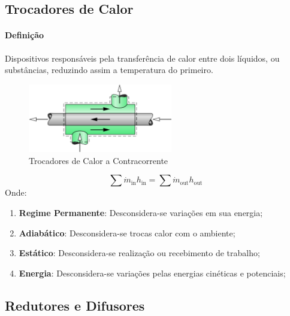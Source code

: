 \documentclass{article}
\begin{document}
        \subsection{Trocadores de Calor}
            \paragraph{Definição}Dispositivos responsáveis pela transferência de calor entre dois líquidos, ou substâncias, reduzindo assim a temperatura do primeiro.
                \begin{figure}[h]
                    \centering
                    \includegraphics[height = 3cm]{Trocador de Calor a Contracorrente.png}
                    \caption{Trocadores de Calor a Contracorrente}
                \end{figure}
                \[\boxed{\sum\dot{m}_{\text{in}} h_{\text{in}} = \sum\dot{m}_{\text{out}} h_{\text{out}}}\]
            Onde:
                \begin{enumerate}[noitemsep]
                    \item \textbf{Regime Permanente}: Desconsidera-se variações em sua energia;
                    \item \textbf{Adiabático}: Desconsidera-se trocas calor com o ambiente;
                    \item \textbf{Estático}: Desconsidera-se realização ou recebimento de trabalho;
                    \item \textbf{Energia}: Desconsidera-se variações pelas energias cinéticas e potenciais;
                \end{enumerate}
\newpage

        \subsection{Redutores e Difusores}
\end{document}
